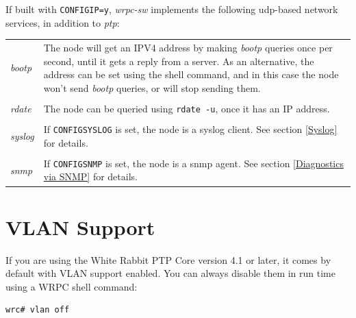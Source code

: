 \documentclass[a4paper, 12pt]{article}
\renewcommand{\_}{\underscore\allowbreak}
\begin{document}
If built with \texttt{CONFIG\_IP=y}, \textit{wrpc-sw} implements the following
udp-based network services, in addition to \textit{ptp}:

\begin{longtable}{  p{6.5cm}  p{9cm} }

\textit{ bootp } &

	The node will get an IPV4 address by making \textit{bootp} queries
        once per second, until it gets a reply from a server. As an
        alternative, the address can be set using the shell command,
        and in this case the node won't send \textit{bootp} queries, or will
        stop sending them.\\
& \\
\textit{ rdate } &

	The node can be queried using \texttt{rdate -u}, once it has an IP
        address.\\
& \\
\textit{ syslog } &

	If \texttt{CONFIG\_SYSLOG} is set, the node is a syslog client.
        See section \ref{Syslog} for details.\\
& \\
\textit{ snmp } &

	If \texttt{CONFIG\_SNMP} is set, the node is a snmp agent.
        See section \ref{Diagnostics via SNMP} for details.\\

\end{longtable}

\newpage
\section{VLAN Support}
\label{VLAN Support}

If you are using the White Rabbit PTP Core version 4.1 or later, it comes by
default with VLAN support enabled. You can always disable them in run time using
a WRPC shell command:
\begin{lstlisting}
wrc# vlan off
\end{lstlisting}
\end{document}
